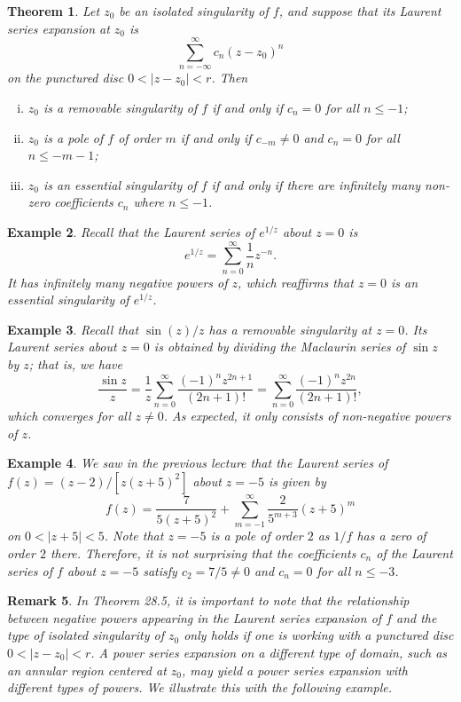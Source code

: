 \documentclass[10pt]{article}
\theoremstyle{newstyle}
\newtheorem{thm}{Theorem}[section]
\newtheorem{remark}[thm]{Remark}
\newtheorem{exmp}[thm]{Example}
\begin{document}
\begin{thm}
Let $z_0$ be an isolated singularity of $f$, and suppose that its Laurent series expansion at $z_0$ is 
\[ \sum_{n=-\infty}^\infty c_n(z-z_0)^n \] 
on the punctured disc $0 < |z-z_0| < r$. Then 
\begin{enumerate}[(i)]
    \item $z_0$ is a removable singularity of $f$ if and only if $c_n = 0$ for all $n \leq -1$; 
    \item $z_0$ is a pole of $f$ of order $m$ if and only if $c_{-m} \neq 0$ and 
    $c_n = 0$ for all $n \leq -m-1$; 
    \item $z_0$ is an essential singularity of $f$ if and only if there are infinitely many 
    non-zero coefficients $c_n$ where $n \leq -1$. 
\end{enumerate}
\end{thm}

\begin{exmp}
Recall that the Laurent series of $e^{1/z}$ about $z=0$ is 
\[ e^{1/z} = \sum_{n=0}^\infty \frac1n z^{-n}. \]
It has infinitely many negative powers of $z$, which reaffirms that $z=0$ is an essential 
singularity of $e^{1/z}$. 
\end{exmp}

\begin{exmp}
Recall that $\sin(z)/z$ has a removable singularity at $z=0$. Its Laurent series about $z=0$ is 
obtained by dividing the Maclaurin series of $\sin z$ by $z$; that is, we have 
\[ \frac{\sin z}z = \frac1z \sum_{n=0}^\infty \frac{(-1)^n z^{2n+1}}{(2n+1)!} = 
\sum_{n=0}^\infty \frac{(-1)^n z^{2n}}{(2n+1)!}, \]
which converges for all $z \neq 0$. As expected, it only consists of non-negative powers of $z$. 
\end{exmp}

\begin{exmp}
We saw in the previous lecture that the Laurent series of $f(z) = (z-2)/[z(z+5)^2]$ about $z = -5$ 
is given by 
\[ f(z) = \frac7{5(z+5)^2} + \sum_{m=-1}^\infty \frac{2}{5^{m+3}}(z+5)^m \] 
on $0 < |z+5| < 5$. Note that $z = -5$ is a pole of order $2$ as $1/f$ has a zero of order $2$ there. 
Therefore, it is not surprising that the coefficients $c_n$ of the Laurent series of $f$ about 
$z = -5$ satisfy $c_2 = 7/5 \neq 0$ and $c_n = 0$ for all $n \leq -3$. 
\end{exmp}

\begin{remark}
In Theorem 28.5, it is important to note that the relationship between negative powers appearing 
in the Laurent series expansion of $f$ and the type of isolated singularity of $z_0$ only 
holds if one is working with a punctured disc $0 < |z-z_0| < r$. A power series expansion 
on a different type of domain, such as an annular region centered at $z_0$, may yield 
a power series expansion with different types of powers. We illustrate this with the following example. 
\end{remark}
\end{document}
